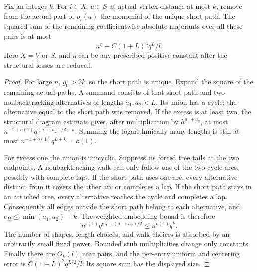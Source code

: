 \begin{lemma}\label{lem:early-near-reference}
Fix an integer \(k\). For \(i\in X\), \(u\in S\) at actual
vertex distance at most \(k\), remove from the actual part of
\(p_i(u)\) the monomial of the unique short path. The squared sum
of the remaining coefficientwise absolute majorants over all these
pairs is at most
\[
 n^\eta+C(1+L)^4q^L/l.
\]
Here \(X=V\) or \(S\), and \(\eta\) can be any prescribed positive
constant after the structural losses are reduced.
\end{lemma}
\begin{proof}
For large \(n\), \(g_0>2k\), so the short path is unique. Expand
the square of the remaining actual paths. A summand consists of that
short path and two nonbacktracking alternatives of lengths
\(a_1,a_2<L\). Its union has a cycle; the alternative equal to the
short path was removed. If the excess is at least two, the
structural diagram estimate gives, after multiplication by
\(h^{a_1+a_2}\), at most
\(n^{-1+o(1)}q^{(a_1+a_2)/2+k}\). Summing the logarithmically many
lengths is still at most \(n^{-1+o(1)}q^{L+k}=o(1)\).

For excess one the union is unicyclic. Suppress its forced tree tails
at the two endpoints. A nonbacktracking walk can only follow one of
the two cycle arcs, possibly with complete laps. If the short path
uses one arc, every alternative distinct from it covers the other
arc or completes a lap. If the short path stays in an attached tree,
every alternative reaches the cycle and completes a lap. Consequently
all edges outside the short path belong to each alternative, and
\(e_H\le\min(a_1,a_2)+k\). The weighted embedding bound is therefore
\[
 n^{o(1)}q^{e_H-(a_1+a_2)/2}
 \le n^{o(1)}q^k.
\]
The number of shapes, length choices, and walk choices is absorbed
by an arbitrarily small fixed power. Bounded stub multiplicities
change only constants. Finally there are \(O_k(l)\) near pairs,
and the per-entry uniform and centering error is
\(C(1+L)^2q^{L/2}/l\). Its square sum has the displayed size.
\end{proof}

